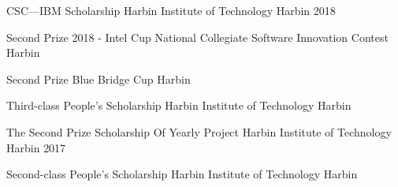 


\vspace{-1.5mm}
\begin{cvhonors}

\cvhonor
{CSC—IBM Scholarship} %
{Harbin Institute of Technology} %
{Harbin} %
{2018} %


\cvhonor
{Second Prize} %
{2018 - Intel Cup National Collegiate Software Innovation Contest} %
{Harbin} %
{} %


\cvhonor
{Second Prize} %
{Blue Bridge Cup} %
{Harbin} %
{} %


\cvhonor
{Third-class People's Scholarship} %
{Harbin Institute of Technology} %
{Harbin} %
{} %


\cvhonor
{The Second Prize Scholarship Of Yearly Project} %
{Harbin Institute of Technology} %
{Harbin} %
{2017} %


\cvhonor
{Second-class People's Scholarship} %
{Harbin Institute of Technology} %
{Harbin} %
{} %

\end{cvhonors}